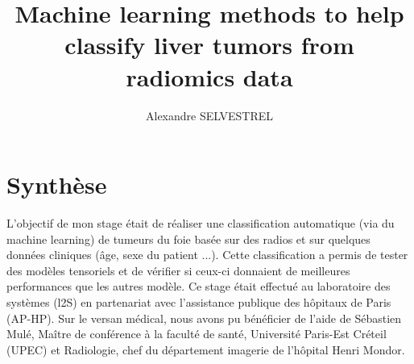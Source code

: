 \documentclass[10pt]{article}
\title{Machine learning methods to help classify liver tumors from radiomics data}
\author[1]{Alexandre SELVESTREL}
\affil[1]{Laboratoire des syst\`emes, Orsay France}
\affil[2]{Centrale-Sup\'elec, Gif-sur-Yvette France}
\begin{document}
\date{}
\maketitle



\newpage

\section*{Synthèse}
\noindent  L'objectif de mon stage était de réaliser une classification automatique (via du machine learning) de tumeurs du foie basée sur des radios et sur quelques données cliniques (âge, sexe du patient ...). Cette classification a permis de tester des modèles tensoriels \cite{multi_rank_1,multi_rank_r} et de vérifier si ceux-ci donnaient de meilleures performances que les autres modèle. Ce stage était effectué au laboratoire des systèmes (l2S) en partenariat avec l'assistance publique des hôpitaux de Paris (AP-HP). Sur le versan médical, nous avons pu bénéficier de l'aide de Sébastien Mulé, Maître de conférence à la faculté de santé, Université Paris-Est Créteil (UPEC) et Radiologie, chef du département imagerie de l'hôpital Henri Mondor.
\end{document}
